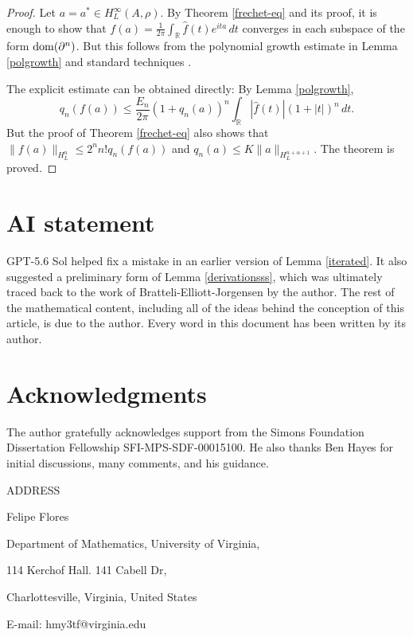 \documentclass[11pt]{article}
\theoremstyle{definition}
\theoremstyle{remark}
\numberwithin{equation}{section}
\numberwithin{equation}{section}
\numberwithin{equation}{section}
\begin{document}
\begin{proof}
Let $a=a^*\in H_L^\infty(A,\rho)$. By Theorem \ref{frechet-eq} and its proof, it is enough to show that $f(a)=\frac{1}{2\pi}\int_{\mathbb R}\widehat f(t)e^{ita}\,dt$ converges in each subspace of the form ${\rm dom}(\partial^n)$. But this follows from the polynomial growth estimate in Lemma \ref{polgrowth} and standard techniques \cite[Theorem 2.5]{Fl25a}.

The explicit estimate can be obtained directly: By Lemma \ref{polgrowth}, 
$$
q_n(f(a))\leq\frac{E_n}{2\pi}(1+q_n(a))^n\int_{\mathbb R}|\widehat f(t)|(1+|t|)^n\,dt.
$$
But the proof of Theorem \ref{frechet-eq} also shows that $\|f(a)\|_{H_L^n}\leq2^nn!q_n(f(a))$ and $q_n(a)\leq K\|a\|_{H_L^{n+\alpha+1}}$. The theorem is proved.
\end{proof}


\section*{AI statement}

GPT-5.6 Sol helped fix a mistake in an earlier version of Lemma \ref{iterated}. It also suggested a preliminary form of Lemma \ref{derivationsss}, which was ultimately traced back to the work of Bratteli-Elliott-Jorgensen by the author. The rest of the mathematical content, including all of the ideas behind the conception of this article, is due to the author. Every word in this document has been written by its author.



\section*{Acknowledgments}

The author gratefully acknowledges support from the Simons Foundation Dissertation Fellowship SFI-MPS-SDF-00015100. He also thanks Ben Hayes for initial discussions, many comments, and his guidance.



\printbibliography

\bigskip
\bigskip
ADDRESS

\smallskip
\smallskip
Felipe Flores

Department of Mathematics, University of Virginia,

114 Kerchof Hall. 141 Cabell Dr,

Charlottesville, Virginia, United States

E-mail: hmy3tf@virginia.edu
\end{document}
